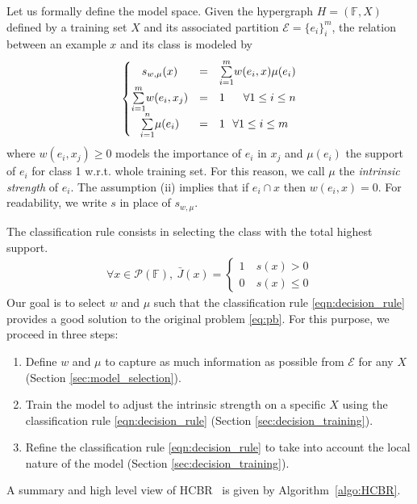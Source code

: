 \documentclass[sigconf,edbt]{acmart-edbt-workshops}
\def\HCBR{{\sc HCBR}}
\begin{document}
Let us formally define the model space. Given the hypergraph $H = (\mathbb F, X)$ defined by a training set $X$ and its associated partition $\mathcal{E} = \{e_i\}_i^m$, the relation between an example $x$ and its class is modeled by
\begin{align}
\label{eqn:model}
\left\{\begin{matrix}
s_{w, \mu}({x}) & = & \underset{i = 1}{\overset{m}\sum} w({e}_i, {x}) \mu({e}_i)%
\\
\underset{i = 1}{\overset{m}\sum} w({e}_i,{x}_j) & = & 1 ~ \hfill \forall 1 \leq i \leq n\\
\underset{i = 1}{\overset{n}\sum} \mu({e}_i) & = & 1 \hfill \forall 1 \leq i \leq m \hfill
\end{matrix}\right.
\end{align} where $w({e}_i, {x}_j) \geq 0$ models the importance of ${e}_i$ in ${x}_j$ and $\mu({e}_i)$ the support of ${e}_i$ for class 1 w.r.t. whole training set. For this reason, we call $\mu$ the {\it intrinsic strength} of $e_i$. The assumption (ii) implies that if ${e}_i \cap {x}$ then $w({e}_i, {x}) = 0$. For readability, we write $s$ in place of $s_{w, \mu}$.

The classification rule consists in selecting the class with the total highest support.
 \begin{align} \tag{R1} \label{eqn:decision_rule}
 \forall x \in \mathcal{P}(\mathbb F), ~ 
   \bar J(x) =  \left\{\begin{matrix}
  1 & ~s(x) > 0\\ 
  0 & ~s(x) \leq  0
  \end{matrix}\right.
  \end{align} Our goal is to select $w$ and $\mu$ such that the classification rule \eqref{eqn:decision_rule} provides a good solution to the original problem \eqref{eq:pb}. For this purpose, we proceed in three steps:

  \begin{enumerate}
  \item Define $w$ and $\mu$ to capture as much information as possible from $\mathcal E$ for any $X$ (Section \ref{sec:model_selection}).
  \item Train the model to adjust the intrinsic strength on a specific $X$ using the classification rule \eqref{eqn:decision_rule} (Section \ref{sec:decision_training}).
  \item Refine the classification rule \eqref{eqn:decision_rule} to take into account the local nature of the model (Section \ref{sec:decision_training}).
  \end{enumerate} A summary and high level view of \HCBR~ is given by Algorithm~\ref{algo:HCBR}.
\end{document}
